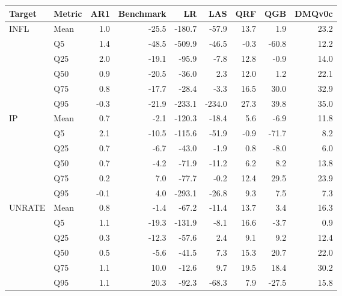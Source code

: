 \begin{tabular}{llrrrrrrr}
\toprule
Target & Metric & AR1 & Benchmark & LR & LAS & QRF & QGB & DMQv0c \\
\midrule
\multirow{6}{*}{INFL} & Mean & 1.0 & -25.5 & -180.7 & -57.9 & 13.7 & 1.9 & 23.2 \\
 & Q5 & 1.4 & -48.5 & -509.9 & -46.5 & -0.3 & -60.8 & 12.2 \\
 & Q25 & 2.0 & -19.1 & -95.9 & -7.8 & 12.8 & -0.9 & 14.0 \\
 & Q50 & 0.9 & -20.5 & -36.0 & 2.3 & 12.0 & 1.2 & 22.1 \\
 & Q75 & 0.8 & -17.7 & -28.4 & -3.3 & 16.5 & 30.0 & 32.9 \\
 & Q95 & -0.3 & -21.9 & -233.1 & -234.0 & 27.3 & 39.8 & 35.0 \\
\midrule
\multirow{6}{*}{IP} & Mean & 0.7 & -2.1 & -120.3 & -18.4 & 5.6 & -6.9 & 11.8 \\
 & Q5 & 2.1 & -10.5 & -115.6 & -51.9 & -0.9 & -71.7 & 8.2 \\
 & Q25 & 0.7 & -6.7 & -43.0 & -1.9 & 0.8 & -8.0 & 6.0 \\
 & Q50 & 0.7 & -4.2 & -71.9 & -11.2 & 6.2 & 8.2 & 13.8 \\
 & Q75 & 0.2 & 7.0 & -77.7 & -0.2 & 12.4 & 29.5 & 23.9 \\
 & Q95 & -0.1 & 4.0 & -293.1 & -26.8 & 9.3 & 7.5 & 7.3 \\
\midrule
\multirow{6}{*}{UNRATE} & Mean & 0.8 & -1.4 & -67.2 & -11.4 & 13.7 & 3.4 & 16.3 \\
 & Q5 & 1.1 & -19.3 & -131.9 & -8.1 & 16.6 & -3.7 & 0.9 \\
 & Q25 & 0.3 & -12.3 & -57.6 & 2.4 & 9.1 & 9.2 & 12.4 \\
 & Q50 & 0.5 & -5.6 & -41.5 & 7.3 & 15.3 & 20.7 & 22.0 \\
 & Q75 & 1.1 & 10.0 & -12.6 & 9.7 & 19.5 & 18.4 & 30.2 \\
 & Q95 & 1.1 & 20.3 & -92.3 & -68.3 & 7.9 & -27.5 & 15.8 \\
\bottomrule
\end{tabular}
